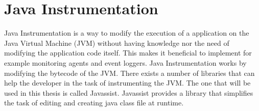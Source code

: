 \section{Java Instrumentation}
Java Instrumentation is a way to modify the execution of a application on the Java Virtual Machine (JVM) without having knowledge nor the need of modifying the application code itself. This makes it beneficial to implement for example monitoring agents and event loggers. Java Instrumentation works by modifying the bytecode of the JVM. \parencite{Java_Instrument} There exists a number of libraries that can help the developer in the task of instrumenting the JVM. The one that will be used in this thesis is called Javassist. Javassist provides a library that simplifies the task of editing and creating java class file at runtime. \parencite{Javassist}